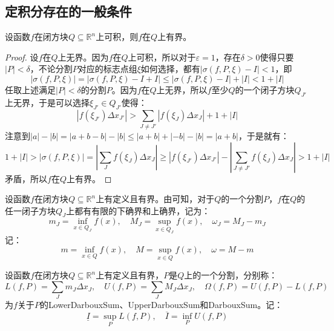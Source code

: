 \subsection{定积分存在的一般条件}
\begin{theorem}\label{theo:RiemannIntegrableBounded}
	设函数$f$在闭方块$Q\subseteq\mathbb{R}^n$上可积，则$f$在$Q$上有界。
\end{theorem}
\begin{proof}
	设$f$在$Q$上无界。因为$f$在$Q$上可积，所以对于$\varepsilon=1$，存在$\delta>0$使得只要$|P|<\delta$，不论分割$P$对应的标志点组$\xi$如何选择，都有$|\sigma(f,P,\xi)-I|<1$，即
	\begin{equation*}
		|\sigma(f,P,\xi)|=|\sigma(f,P,\xi)-I+I|\leqslant|\sigma(f,P,\xi)-I|+|I|<1+|I|
	\end{equation*}
	任取上述满足$|P|<\delta$的分割$P$。因为$f$在$Q$上无界，所以$f$至少$Q$的一个闭子方块$Q_{J'}$上无界，于是可以选择$\xi_{J'}\in Q_{J'}$使得：
	\begin{equation*}
		|f(\xi_{J'})\Delta x_{J'}|>\sum_{J\ne {J'}}|f(\xi_J)\Delta x_J|+1+|I|
	\end{equation*}
	注意到$|a|-|b|=|a+b-b|-|b|\leqslant|a+b|+|-b|-|b|=|a+b|$，于是就有：
	\begin{equation*}
		1+|I|>|\sigma(f,P,\xi)|=\left|\sum_{J}f(\xi_J)\Delta x_J\right|\geqslant|f(\xi_{J'})\Delta x_{J'}|-\left|\sum_{J\ne J'}f(\xi_J)\Delta x_J\right|>1+|I|
	\end{equation*}
	矛盾，所以$f$在$Q$上有界。
\end{proof}
\begin{definition}
	设函数$f$在闭方块$Q\subseteq\mathbb{R}^n$上有定义且有界。由可知，对于$Q$的一个分割$P$，$f$在$Q$的任一闭子方块$Q_J$上都有有限的下确界和上确界，记为：
	\begin{equation*}
		m_J=\inf_{x\in Q_J}f(x),\quad M_J=\sup_{x\in Q_J}f(x),\quad\omega_J=M_J-m_J
	\end{equation*}
	记：
	\begin{equation*}
		m=\inf_{x\in Q}f(x),\quad M=\sup_{x\in Q}f(x),\quad\omega=M-m
	\end{equation*}
\end{definition}
\begin{definition}
	设函数$f$在闭方块$Q\subseteq\mathbb{R}^n$上有定义且有界，$P$是$Q$上的一个分割，分别称：
	\begin{equation*}
		L(f,P)=\sum_{J}m_J\Delta x_J,\quad U(f,P)=\sum_{J}M_J\Delta x_J,\quad\Omega(f,P)=U(f,P)-L(f,P)
	\end{equation*}
	为$f$关于$P$的\gls{LowerDarbouxSum}、\gls{UpperDarbouxSum}和\gls{DarbouxSum}。记：
	\begin{equation*}
		\underline{I}=\sup_PL(f,P),\quad\overline{I}=\inf_PU(f,P)
	\end{equation*}
\end{definition}
